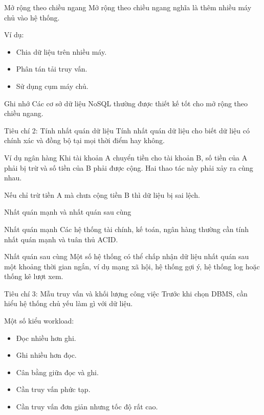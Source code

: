 \documentclass[aspectratio=169,11pt]{beamer}
\newcommand{\smallitem}{\setlength{\itemsep}{2pt}\setlength{\parskip}{0pt}}
\begin{document}
\begin{frame}{Mở rộng theo chiều ngang}
Mở rộng theo chiều ngang nghĩa là thêm nhiều máy chủ vào hệ thống.

\vspace{2mm}
Ví dụ:
\begin{itemize}
  \smallitem
  \item Chia dữ liệu trên nhiều máy.
  \item Phân tán tải truy vấn.
  \item Sử dụng cụm máy chủ.
\end{itemize}

\begin{block}{Ghi nhớ}
Các cơ sở dữ liệu NoSQL thường được thiết kế tốt cho mở rộng theo chiều ngang.
\end{block}
\end{frame}

\begin{frame}{Tiêu chí 2: Tính nhất quán dữ liệu}
Tính nhất quán dữ liệu cho biết dữ liệu có chính xác và đồng bộ tại mọi thời điểm hay không.

\begin{exampleblock}{Ví dụ ngân hàng}
Khi tài khoản A chuyển tiền cho tài khoản B, số tiền của A phải bị trừ và số tiền của B phải được cộng. Hai thao tác này phải xảy ra cùng nhau.
\end{exampleblock}

Nếu chỉ trừ tiền A mà chưa cộng tiền B thì dữ liệu bị sai lệch.
\end{frame}

\begin{frame}{Nhất quán mạnh và nhất quán sau cùng}
\begin{block}{Nhất quán mạnh}
Các hệ thống tài chính, kế toán, ngân hàng thường cần tính nhất quán mạnh và tuân thủ ACID.
\end{block}

\begin{block}{Nhất quán sau cùng}
Một số hệ thống có thể chấp nhận dữ liệu nhất quán sau một khoảng thời gian ngắn, ví dụ mạng xã hội, hệ thống gợi ý, hệ thống log hoặc thống kê lượt xem.
\end{block}
\end{frame}

\begin{frame}{Tiêu chí 3: Mẫu truy vấn và khối lượng công việc}
Trước khi chọn DBMS, cần hiểu hệ thống chủ yếu làm gì với dữ liệu.

\vspace{2mm}
Một số kiểu workload:
\begin{itemize}
  \smallitem
  \item Đọc nhiều hơn ghi.
  \item Ghi nhiều hơn đọc.
  \item Cân bằng giữa đọc và ghi.
  \item Cần truy vấn phức tạp.
  \item Cần truy vấn đơn giản nhưng tốc độ rất cao.
\end{itemize}
\end{frame}
\end{document}
